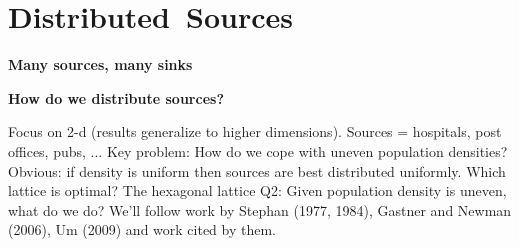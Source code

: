 

\section{Distributed\ Sources}


  \textbf{Many sources, many sinks}
  
  \textbf{How do we distribute sources?}
    
     Focus on 2-d (results generalize to higher dimensions).
     Sources = hospitals, post offices, pubs, ...
     \alert{Key problem:} How do we cope with uneven population densities?
     Obvious: if density is uniform then sources are best distributed
      \alert{uniformly}.
     Which lattice is optimal? {The \alert{hexagonal lattice}}
     \alert{Q2:} Given population density is uneven, what do we do?
     We'll follow work by Stephan (1977, 1984)\cite{stephan1977a,stephan1984a},
      Gastner and Newman (2006)\cite{gastner2006c}, 
      Um \etal (2009)\cite{um2009a} and work cited by them.
    
